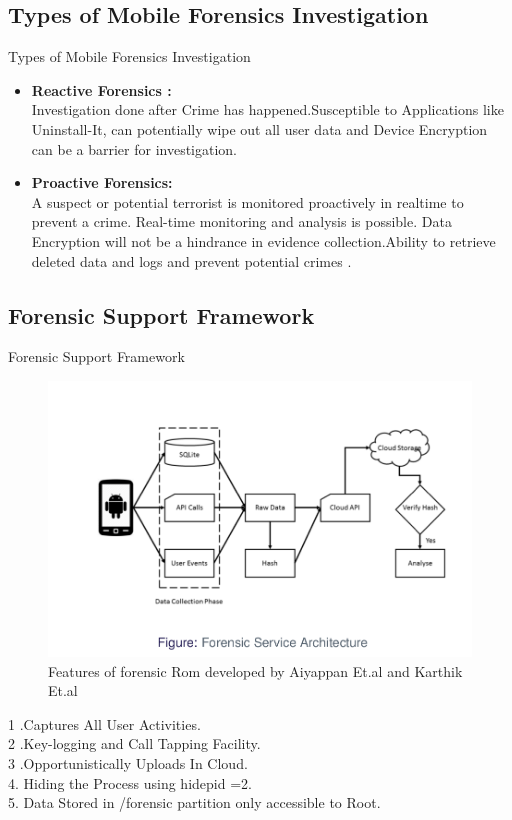 \documentclass{beamer}
\begin{document}
\subsection{Types of Mobile Forensics Investigation}
\begin{frame}{Types of Mobile Forensics Investigation}
\begin{itemize}
\item \textbf{Reactive Forensics :}\\
Investigation done after Crime has happened.Susceptible to Applications like Uninstall-It, can potentially wipe out all user data and Device Encryption can be a barrier for investigation.

\item \textbf{Proactive Forensics:}\\
A suspect or potential terrorist is monitored proactively in realtime to prevent a crime.
Real-time monitoring and analysis is possible.
Data Encryption will not be a hindrance in evidence collection.Ability to retrieve deleted data and logs and prevent potential crimes .
\end{itemize}
\end{frame}

\subsection{Forensic Support Framework}
\begin{frame}{Forensic Support Framework}

\begin{figure}
\centering
\caption{Features of forensic Rom developed by Aiyappan Et.al \cite{Aiyappan}  and Karthik Et.al \cite{Karthik} }
\includegraphics[width=.6\textwidth,height=.4\textheight]{images/forensic}

\label{imageLabel}
 \end{figure}
 \small 1 .Captures All User Activities.\\
 \small 2 .Key-logging and Call  Tapping 		 Facility.\\
\small  3 .Opportunistically Uploads In Cloud.\\
\small  4. Hiding the Process using hidepid =2.\\
\small  5. Data Stored in /forensic partition only accessible to Root.\\
 
\end{frame}
\end{document}

